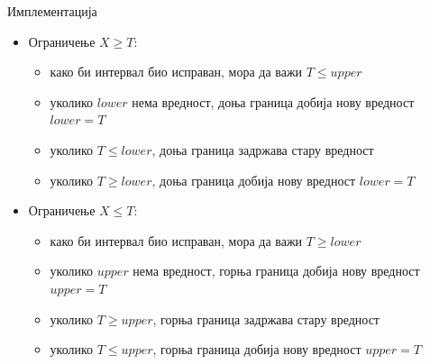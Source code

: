 \documentclass[xcolor=table]{beamer}
\begin{document}
\begin{frame}[allowframebreaks]{Имплементација}
        \begin{itemize}
            \item Ограничење \begin{math}X \geq T\end{math}:
            \begin{itemize}
                \item како би интервал био исправан, мора да важи \begin{math}T \leq upper\end{math}
                \item уколико \begin{math}lower\end{math} нема вредност, доња граница добија нову вредност \begin{math}lower = T\end{math}
                \item уколико \begin{math}T \leq lower\end{math}, доња граница задржава стару вредност
                \item уколико \begin{math}T \geq lower\end{math}, доња граница добија нову вредност \begin{math}lower = T\end{math}
            \end{itemize}
        \end{itemize}
        
        \framebreak
        
        \begin{itemize}
            \item Ограничење \begin{math}X \leq T\end{math}:
            \begin{itemize}
                \item како би интервал био исправан, мора да важи \begin{math}T \geq lower\end{math}
                \item уколико \begin{math}upper\end{math} нема вредност, горња граница добија нову вредност \begin{math}upper = T\end{math}
                \item уколико \begin{math}T \geq upper\end{math}, горња граница задржава стару вредност
                \item уколико \begin{math}T \leq upper\end{math}, горња граница добија нову вредност \begin{math}upper = T\end{math}
            \end{itemize}
        \end{itemize}
        

\end{frame}
\end{document}
